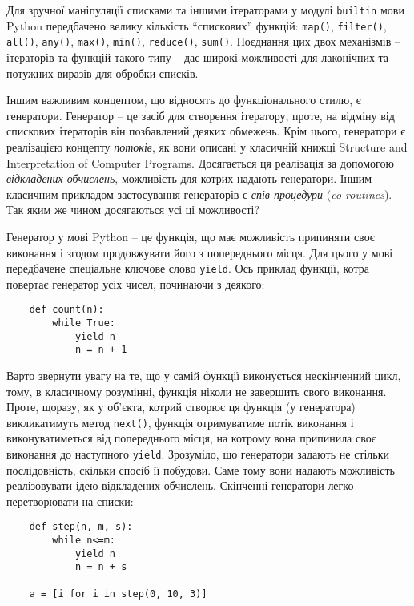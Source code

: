 \documentclass[a4paper, 12pt, onsedie]{article}
\begin{document}
    Для зручної маніпуляції списками та іншими ітераторами у модулі 
    \texttt{\textunderscore \textunderscore builtin\textunderscore \textunderscore }
    мови Python передбачено велику кількість ``спискових'' функцій: \texttt{map()}, 
    \texttt{filter()}, \texttt{all()}, \texttt{any()}, \texttt{max()}, \texttt{min()},
    \texttt{reduce()}, \texttt{sum()}. Поєднання цих двох механізмів -- ітераторів
    та функцій такого типу -- дає широкі можливості для лаконічних та потужних
    виразів для обробки списків.

    Іншим важливим концептом, що відносять до функціонального стилю, є генератори. 
    Генератор -- це засіб для створення ітератору, проте, на відміну від спискових
    ітераторів він позбавлений деяких обмежень. Крім цього, генератори є реалізацією
    концепту \emph{потоків}, як вони описані у класичній книжці Structure and 
    Interpretation of Computer Programs. Досягається ця реалізація за допомогою
    \emph{відкладених обчислень}, можливість для котрих надають генератори. Іншим
    класичним прикладом застосування генераторів є \emph{спів-процедури} 
    (\emph{co-routines}). Так яким же чином досягаються усі ці можливості?

    Генератор у мові Python -- це функція, що має можливість припиняти своє виконання
    і згодом продовжувати його з попереднього місця. Для цього у мові передбачене 
    спеціальне ключове слово \texttt{yield}. Ось приклад функції, котра повертає 
    генератор усіх чисел, починаючи з деякого:
    \begin{verbatim}
    def count(n):
        while True:
            yield n
            n = n + 1
    \end{verbatim}
    Варто звернути увагу на те, що у самій функції виконується нескінченний цикл, тому,
    в класичному розумінні, функція ніколи не завершить свого виконання. Проте, щоразу,
    як у об'єкта, котрий створює ця функція (у генератора) викликатимуть метод 
    \texttt{next()}, функція отримуватиме потік виконання і виконуватиметься від 
    попереднього місця, на котрому вона припинила своє виконання до наступного 
    \texttt{yield}. Зрозуміло, що генератори задають не стільки послідовність, скільки
    спосіб її побудови. Саме тому вони надають можливість реалізовувати ідею відкладених
    обчислень. Скінченні генератори легко перетворювати на списки:
    \begin{verbatim}
    def step(n, m, s):
        while n<=m:
            yield n
            n = n + s

    a = [i for i in step(0, 10, 3)]
    \end{verbatim}
\end{document}
